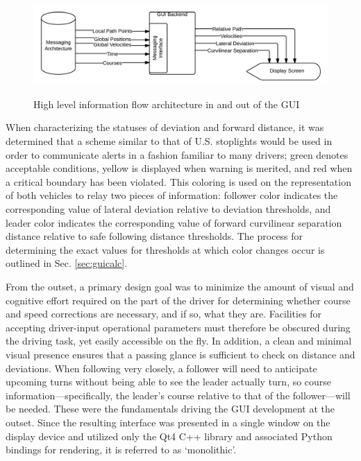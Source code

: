 \begin{figure}[ht] \caption{High level information flow architecture in and out of the GUI} \centering \label{fig:blackboxflow}
    \includegraphics[width=6.5in]{./figs/blackbox_flowchart.png}
\end{figure}

When characterizing the statuses of deviation and forward distance, it was determined that a scheme similar to that of U.S. stoplights would be used in order to communicate alerts in a fashion familiar to many drivers; green denotes acceptable conditions, yellow is displayed when warning is merited, and red when a critical boundary has been violated. This coloring is used on the representation of both vehicles to relay two pieces of information: follower color indicates the corresponding value of lateral deviation relative to deviation thresholds, and leader color indicates the corresponding value of forward curvilinear separation distance relative to safe following distance thresholds. The process for determining the exact values for thresholds at which color changes occur is outlined in Sec. \ref{sec:guicalc}.

From the outset, a primary design goal was to minimize the amount of visual and cognitive effort required on the part of the driver for determining whether course and speed corrections are necessary, and if so, what they are. Facilities for accepting driver-input operational parameters must therefore be obscured during the driving task, yet easily accessible on the fly. In addition, a clean and minimal visual presence ensures that a passing glance is sufficient to check on distance and deviations. When following very closely, a follower will need to anticipate upcoming turns without being able to see the leader actually turn, so course information---specifically, the leader's course relative to that of the follower---will be needed.  These were the fundamentals driving the GUI development at the outset. Since the resulting interface was presented in a single window on the display device and utilized only the Qt4 C++ library and associated Python bindings for rendering, it is referred to as `monolithic'.

